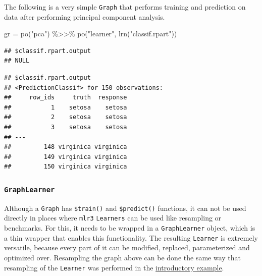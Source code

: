 \documentclass[
]{scrbook}
\newenvironment{Shaded}{\begin{snugshade}}{\end{snugshade}}
\newcommand{\FunctionTok}[1]{\textcolor[rgb]{0.00,0.00,0.00}{#1}}
\newcommand{\NormalTok}[1]{#1}
\newcommand{\OtherTok}[1]{\textcolor[rgb]{0.56,0.35,0.01}{#1}}
\newcommand{\SpecialCharTok}[1]{\textcolor[rgb]{0.00,0.00,0.00}{#1}}
\newcommand{\StringTok}[1]{\textcolor[rgb]{0.31,0.60,0.02}{#1}}
\renewenvironment{Shaded} {\begin{snugshade}\small} {\end{snugshade}}
\begin{document}
The following is a very simple \texttt{Graph} that performs training and prediction on data after performing principal component analysis.

\begin{Shaded}
\begin{Highlighting}[]
\NormalTok{gr }\OtherTok{=} \FunctionTok{po}\NormalTok{(}\StringTok{"pca"}\NormalTok{) }\SpecialCharTok{\%\textgreater{}\textgreater{}\%} \FunctionTok{po}\NormalTok{(}\StringTok{"learner"}\NormalTok{,}
  \FunctionTok{lrn}\NormalTok{(}\StringTok{"classif.rpart"}\NormalTok{))}
\end{Highlighting}
\end{Shaded}

\begin{Shaded}
\end{Shaded}

\begin{verbatim}
## $classif.rpart.output
## NULL
\end{verbatim}

\begin{Shaded}
\end{Shaded}

\begin{verbatim}
## $classif.rpart.output
## <PredictionClassif> for 150 observations:
##     row_ids     truth  response
##           1    setosa    setosa
##           2    setosa    setosa
##           3    setosa    setosa
## ---                            
##         148 virginica virginica
##         149 virginica virginica
##         150 virginica virginica
\end{verbatim}

\hypertarget{graphlearner}{%
\subsubsection{\texorpdfstring{\texttt{GraphLearner}}{GraphLearner}}\label{graphlearner}}

Although a \texttt{Graph} has \texttt{\$train()} and \texttt{\$predict()} functions, it can not be used directly in places where \texttt{mlr3} \texttt{Learners} can be used like resampling or benchmarks.
For this, it needs to be wrapped in a \texttt{GraphLearner} object, which is a thin wrapper that enables this functionality.
The resulting \texttt{Learner} is extremely versatile, because every part of it can be modified, replaced, parameterized and optimized over.
Resampling the graph above can be done the same way that resampling of the \texttt{Learner} was performed in the \protect\hyperlink{whats-the-point}{introductory example}.
\end{document}
